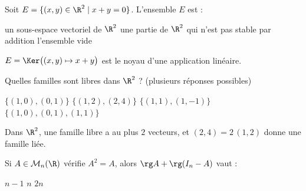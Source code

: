 
\begin{question}
Soit $E=\{(x,y)\in\R^2 \mid x+y=0\}$. L'ensemble $E$ est :
\begin{reponses}
  \bonne un sous-espace vectoriel de $\R^2$
  \mauvaise une partie de $\R^2$ qui n'est pas stable par addition
  \mauvaise l'ensemble vide
\end{reponses}
\begin{explication}
$E=\Ker\big((x,y)\mapsto x+y\big)$ est le noyau d'une application linéaire.
\end{explication}
\end{question}

\begin{question}
Quelles familles sont libres dans $\R^2$ ? (plusieurs réponses possibles)
\begin{reponses}
  \bonne $\{(1,0),(0,1)\}$
  \mauvaise $\{(1,2),(2,4)\}$
  \bonne $\{(1,1),(1,-1)\}$
  \mauvaise $\{(1,0),(0,1),(1,1)\}$
\end{reponses}
\begin{explication}
Dans $\R^2$, une famille libre a au plus $2$ vecteurs, et $(2,4)=2\,(1,2)$ donne une famille liée.
\end{explication}
\end{question}

\begin{question}
Si $A\in\mathcal{M}_n(\R)$ vérifie $A^2=A$, alors $\rg A + \rg(I_n-A)$ vaut :
\begin{reponses}
  \mauvaise $n-1$
  \bonne $n$
  \mauvaise $2n$
\end{reponses}
\end{question}
